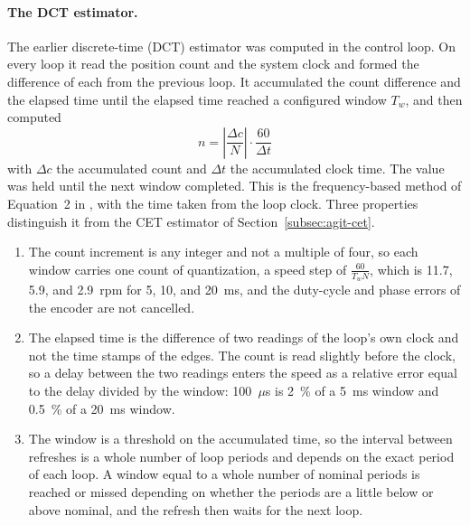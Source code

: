 \paragraph{The DCT estimator.}
The earlier discrete-time (DCT) estimator was computed in the control loop. On every loop it read the position count and the system clock and formed the difference of each from the previous loop. It accumulated the count difference and the elapsed time until the elapsed time reached a configured window $T_w$, and then computed
\begin{equation}
    n = \left| \frac{\Delta c}{N} \right| \cdot \frac{60}{\Delta t}
    \label{eq:dct}
\end{equation}
with $\Delta c$ the accumulated count and $\Delta t$ the accumulated clock time. The value was held until the next window completed. This is the frequency-based method of Equation~2 in \citet{anuchin2019}, with the time taken from the loop clock. Three properties distinguish it from the CET estimator of Section~\ref{subsec:agit-cet}.
\begin{enumerate}
    \item The count increment is any integer and not a multiple of four, so each window carries one count of quantization, a speed step of $\frac{60}{T_w N}$, which is 11.7, 5.9, and 2.9~rpm for 5, 10, and 20~ms, and the duty-cycle and phase errors of the encoder are not cancelled.
    \item The elapsed time is the difference of two readings of the loop's own clock and not the time stamps of the edges. The count is read slightly before the clock, so a delay between the two readings enters the speed as a relative error equal to the delay divided by the window: 100~$\mu$s is 2~\% of a 5~ms window and 0.5~\% of a 20~ms window.
    \item The window is a threshold on the accumulated time, so the interval between refreshes is a whole number of loop periods and depends on the exact period of each loop. A window equal to a whole number of nominal periods is reached or missed depending on whether the periods are a little below or above nominal, and the refresh then waits for the next loop.
\end{enumerate}

